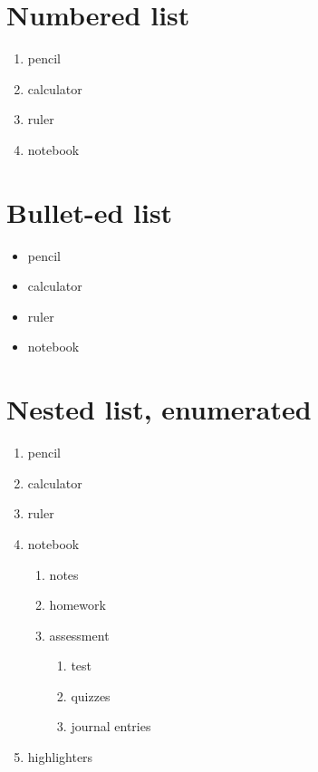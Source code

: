 \documentclass[11pt]{article}
\begin{document}
\section{Numbered list}

\begin{enumerate}

\item pencil
\item calculator
\item ruler 
\item notebook

\end{enumerate}




\section{Bullet-ed list}

\begin{itemize}

\item pencil
\item calculator
\item ruler 
\item notebook

\end{itemize}




\section{Nested list, enumerated}

\begin{enumerate}

\item pencil
\item calculator
\item ruler 
\item notebook
		\begin{enumerate}
		\item notes
		\item homework
		\item assessment 
				\begin{enumerate}
				\item test
				\item quizzes
				\item journal entries
				\end{enumerate}
		\end{enumerate}
\item highlighters

\end{enumerate}
\end{document}
